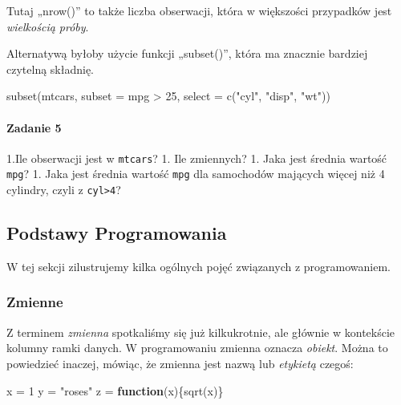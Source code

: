 \documentclass[
]{article}
\newenvironment{Shaded}{\begin{snugshade}}{\end{snugshade}}
\newcommand{\AttributeTok}[1]{\textcolor[rgb]{0.77,0.63,0.00}{#1}}
\newcommand{\ControlFlowTok}[1]{\textcolor[rgb]{0.13,0.29,0.53}{\textbf{#1}}}
\newcommand{\DecValTok}[1]{\textcolor[rgb]{0.00,0.00,0.81}{#1}}
\newcommand{\FunctionTok}[1]{\textcolor[rgb]{0.00,0.00,0.00}{#1}}
\newcommand{\NormalTok}[1]{#1}
\newcommand{\OtherTok}[1]{\textcolor[rgb]{0.56,0.35,0.01}{#1}}
\newcommand{\SpecialCharTok}[1]{\textcolor[rgb]{0.00,0.00,0.00}{#1}}
\newcommand{\StringTok}[1]{\textcolor[rgb]{0.31,0.60,0.02}{#1}}
\begin{document}
Tutaj „nrow()'' to także liczba obserwacji, która w większości
przypadków jest \emph{wielkością próby}.

Alternatywą byłoby użycie funkcji „subset()'', która ma znacznie
bardziej czytelną składnię.

\begin{Shaded}
\begin{Highlighting}[]
\FunctionTok{subset}\NormalTok{(mtcars, }\AttributeTok{subset =}\NormalTok{ mpg }\SpecialCharTok{\textgreater{}} \DecValTok{25}\NormalTok{, }\AttributeTok{select =} \FunctionTok{c}\NormalTok{(}\StringTok{"cyl"}\NormalTok{, }\StringTok{"disp"}\NormalTok{, }\StringTok{"wt"}\NormalTok{))}
\end{Highlighting}
\end{Shaded}

\hypertarget{zadanie-5}{%
\paragraph{Zadanie 5}\label{zadanie-5}}

1.Ile obserwacji jest w \texttt{mtcars}? 1. Ile zmiennych? 1. Jaka jest
średnia wartość \texttt{mpg}? 1. Jaka jest średnia wartość \texttt{mpg}
dla samochodów mających więcej niż 4 cylindry, czyli z
\texttt{cyl\textgreater{}4}?

\hypertarget{podstawy-programowania}{%
\subsection{Podstawy Programowania}\label{podstawy-programowania}}

W tej sekcji zilustrujemy kilka ogólnych pojęć związanych z
programowaniem.

\hypertarget{zmienne}{%
\subsubsection{Zmienne}\label{zmienne}}

Z terminem \emph{zmienna} spotkaliśmy się już kilkukrotnie, ale głównie
w kontekście kolumny ramki danych. W programowaniu zmienna oznacza
\emph{obiekt}. Można to powiedzieć inaczej, mówiąc, że zmienna jest
nazwą lub \emph{etykietą} czegoś:

\begin{Shaded}
\begin{Highlighting}[]
\NormalTok{x }\OtherTok{=} \DecValTok{1}
\NormalTok{y }\OtherTok{=} \StringTok{"roses"}
\NormalTok{z }\OtherTok{=} \ControlFlowTok{function}\NormalTok{(x)\{}\FunctionTok{sqrt}\NormalTok{(x)\}}
\end{Highlighting}
\end{Shaded}
\end{document}
